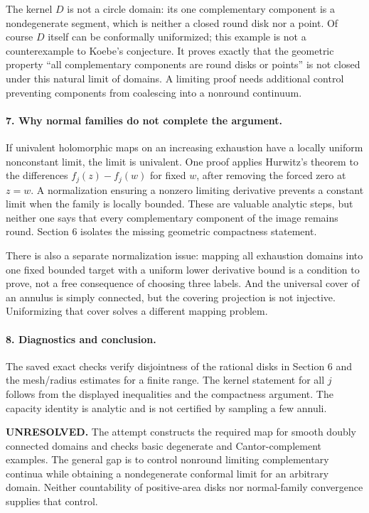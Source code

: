 \documentclass[11pt]{article}
\begin{document}
The kernel $D$ is not a circle domain: its one complementary component is a nondegenerate segment, which is neither a closed round disk nor a point. Of course $D$ itself can be conformally uniformized; this example is not a counterexample to Koebe's conjecture. It proves exactly that the geometric property ``all complementary components are round disks or points'' is not closed under this natural limit of domains. A limiting proof needs additional control preventing components from coalescing into a nonround continuum.

\paragraph{7. Why normal families do not complete the argument.}
If univalent holomorphic maps on an increasing exhaustion have a locally uniform nonconstant limit, the limit is univalent. One proof applies Hurwitz's theorem to the differences $f_j(z)-f_j(w)$ for fixed $w$, after removing the forced zero at $z=w$. A normalization ensuring a nonzero limiting derivative prevents a constant limit when the family is locally bounded. These are valuable analytic steps, but neither one says that every complementary component of the image remains round. Section 6 isolates the missing geometric compactness statement.

There is also a separate normalization issue: mapping all exhaustion domains into one fixed bounded target with a uniform lower derivative bound is a condition to prove, not a free consequence of choosing three labels. And the universal cover of an annulus is simply connected, but the covering projection is not injective. Uniformizing that cover solves a different mapping problem.

\paragraph{8. Diagnostics and conclusion.}
The saved exact checks verify disjointness of the rational disks in Section 6 and the mesh/radius estimates for a finite range. The kernel statement for all $j$ follows from the displayed inequalities and the compactness argument. The capacity identity is analytic and is not certified by sampling a few annuli.

\textbf{UNRESOLVED.} The attempt constructs the required map for smooth doubly connected domains and checks basic degenerate and Cantor-complement examples. The general gap is to control nonround limiting complementary continua while obtaining a nondegenerate conformal limit for an arbitrary domain. Neither countability of positive-area disks nor normal-family convergence supplies that control.
\end{document}
